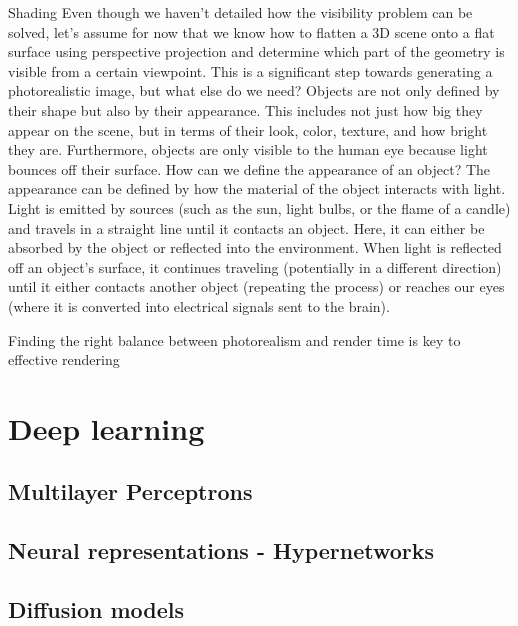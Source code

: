 Shading
Even though we haven't detailed how the visibility problem can be solved, let's assume for now that we know how to flatten a 3D scene onto a flat surface using perspective projection and determine which part of the geometry is visible from a certain viewpoint. This is a significant step towards generating a photorealistic image, but what else do we need? Objects are not only defined by their shape but also by their appearance. This includes not just how big they appear on the scene, but in terms of their look, color, texture, and how bright they are. Furthermore, objects are only visible to the human eye because light bounces off their surface. How can we define the appearance of an object? The appearance can be defined by how the material of the object interacts with light. Light is emitted by sources (such as the sun, light bulbs, or the flame of a candle) and travels in a straight line until it contacts an object. Here, it can either be absorbed by the object or reflected into the environment. When light is reflected off an object's surface, it continues traveling (potentially in a different direction) until it either contacts another object (repeating the process) or reaches our eyes (where it is converted into electrical signals sent to the brain).

Finding the right balance between photorealism and render time is key to effective rendering


\section{Deep learning}
\subsection{Multilayer Perceptrons}
\subsection{Neural representations - Hypernetworks}
\subsection{Diffusion models}